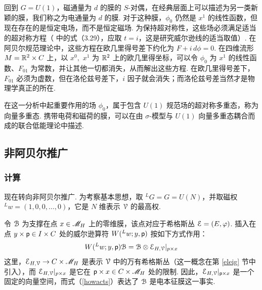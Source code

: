 回到 $G=U(1)$，磁通量为 $d$ 的膜的 $S$-对偶，在经典层面上可以描述为另一类新颖的膜，我们称之为电通量为 $d$ 的膜. 对于这种膜，$\phi_0$ 仍然是 $x^1$ 的线性函数，但现在存在的是恒定电场，而不是恒定磁场. 为保持超对称性，这些场必须满足适当的超对称方程（\cite{KW} 中的式（3.29），应取 $t=i$，这是研究威尔逊线的适当取值）. 在阿贝尔规范理论中，这些方程在欧几里得号差下约化为 $F+i\,d\phi=0$. 在四维流形 $M=\Bbb{R}^2\times C$ 上，以 $x^0,$ $x^1$ 为 $\Bbb{R}^2$ 上的欧几里得坐标，可以令 $\phi_0$ 为 $x^1$ 的线性函数、$F_{01}$ 为常数，并让其他一切都消失，从而解出这些方程. 在欧几里得号差下，$F_{01}$ 必须为虚数，但在洛伦兹号差下，$i$ 因子就会消失；而洛伦兹号差当然才是物理学真正的所在.

在这一分析中起重要作用的场 $\phi_0$，属于包含 $U(1)$ 规范场的超对称多重态，称为向量多重态. 携带电荷和磁荷的膜，可以在由 $\sigma$-模型与 $U(1)$ 向量多重态耦合而成的联合低能理论中描述.



\subsection{非阿贝尔推广}
\label{actsun}
\subsubsection{计算}

现在转向非阿贝尔推广. 为考察基本思想，取 $^LG=G=U(N)$，并取磁权 $^Lw=(1,0,0,\dots,0)$，它是 $N$ 维表示 ${\cal V}$ 的最高权.

令 ${\cal B}$ 为支撑在点 $x\in \MH$ 上的零维膜，该点对应于希格斯丛 ${\cal E}=(E,\varphi)$. 插入在点 $y\times \pp\in I\times C$ 处的威尔逊算符 $W({}^Lw;y,\pp)$ 按如下方式作用：
\begin{equation}\label{howacts} W({}^Lw;y,\pp){\cal B}={\cal
B}\otimes \EE_{H,\cal V}|_{p\times x}\end{equation} 这里，$\EE_{H,\cal V}\to C\times \MH$ 是表示 ${\cal V}$ 中的万有希格斯丛（这一概念在第 \ref{eleig} 节中引入），而 $\EE_{H,\cal V}|_{p\times x}$ 是它在 $\pp\times x\in C\times \MH$ 处的限制. 因此，$\EE_{H,\cal V}|_{\pp\times x}$ 是一个固定的向量空间，而式（\ref{howacts}）表达了 ${\cal B}$ 是电本征膜这一事实.

